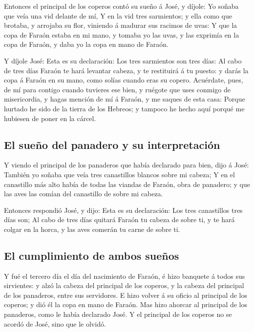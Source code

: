  Entonces el principal de los coperos contó su sueño á
José, y díjole: Yo soñaba que veía una vid delante de mí,
 Y en la vid tres sarmientos; y ella como que brotaba, y
arrojaba su flor, viniendo á madurar sus racimos de uvas:
 Y que la copa de Faraón estaba en mi mano, y tomaba yo
las uvas, y las exprimía en la copa de Faraón, y daba yo la copa en mano
de Faraón.

 Y díjole José: Esta es su declaración: Los tres
sarmientos son tres días:  Al cabo de tres días Faraón te
hará levantar cabeza, y te restituirá á tu puesto: y darás la copa á
Faraón en su mano, como solías cuando eras su copero. 
Acuérdate, pues, de mí para contigo cuando tuvieres ese bien, y ruégote
que uses conmigo de misericordia, y hagas mención de mí á Faraón, y me
saques de esta casa:  Porque hurtado he sido de la tierra
de los Hebreos; y tampoco he hecho aquí porqué me hubiesen de poner en
la cárcel.

\hypertarget{el-sueuxf1o-del-panadero-y-su-interpretaciuxf3n}{%
\subsection{El sueño del panadero y su
interpretación}\label{el-sueuxf1o-del-panadero-y-su-interpretaciuxf3n}}

 Y viendo el principal de los panaderos que había
declarado para bien, dijo á José: También yo soñaba que veía tres
canastillos blancos sobre mi cabeza;  Y en el canastillo
más alto había de todas las viandas de Faraón, obra de panadero; y que
las aves las comían del canastillo de sobre mi cabeza.

 Entonces respondió José, y dijo: Esta es su declaración:
Los tres canastillos tres días son;  Al cabo de tres días
quitará Faraón tu cabeza de sobre ti, y te hará colgar en la horca, y
las aves comerán tu carne de sobre ti.

\hypertarget{el-cumplimiento-de-ambos-sueuxf1os}{%
\subsection{El cumplimiento de ambos
sueños}\label{el-cumplimiento-de-ambos-sueuxf1os}}

 Y fué el tercero día el día del nacimiento de Faraón, é
hizo banquete á todos sus sirvientes: y alzó la cabeza del principal de
los coperos, y la cabeza del principal de los panaderos, entre sus
servidores.  E hizo volver á su oficio al principal de
los coperos; y dió él la copa en mano de Faraón.  Mas
hizo ahorcar al principal de los panaderos, como le había declarado
José.  Y el principal de los coperos no se acordó de
José, sino que le olvidó.

